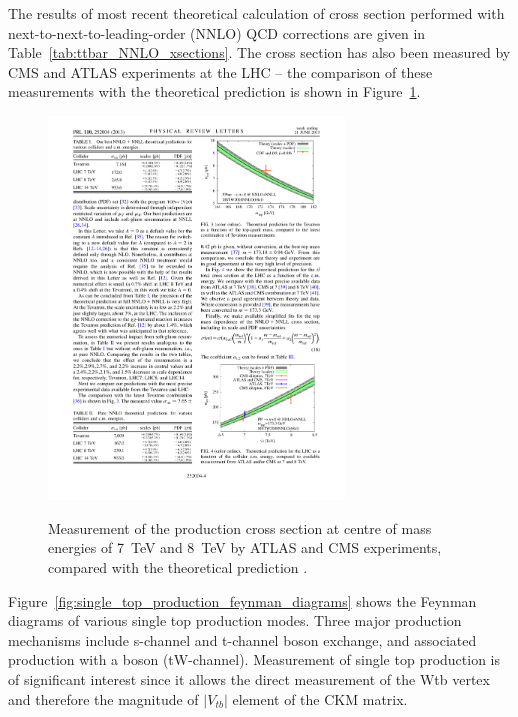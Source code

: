 The results of most recent theoretical calculation of \ttbar cross section performed with next-to-next-to-leading-order
(NNLO) QCD corrections \autocite{NNLO_ttbar} are given in Table~\ref{tab:ttbar_NNLO_xsections}. The cross section has
also been measured by CMS and ATLAS experiments at the LHC -- the comparison of these measurements with the theoretical
prediction is shown in Figure~\ref{fig:xsections_comparison_NNLO}.




\begin{figure}[!hbtp]
   \centering
   {\includegraphics[width=0.7\textwidth]{xsections_comparison_NNLO}}
   \caption[Measurement of the \ttbar production cross section.]{Measurement of the \ttbar production cross section at
   centre of mass energies of \SI{7}{\TeV} and \SI{8}{\TeV} by ATLAS and CMS experiments, compared with the theoretical
   prediction \autocite{NNLO_ttbar}.}
   \label{fig:xsections_comparison_NNLO}
\end{figure}


Figure~\ref{fig:single_top_production_feynman_diagrams} shows the Feynman diagrams of various single top production
modes. Three major production mechanisms include s-channel and t-channel \W boson exchange, and associated production
with a \W boson (tW-channel). Measurement of single top production is of significant interest since it allows the direct
measurement of the Wtb vertex and therefore the magnitude of $|V_{tb}|$ element of the CKM matrix.

